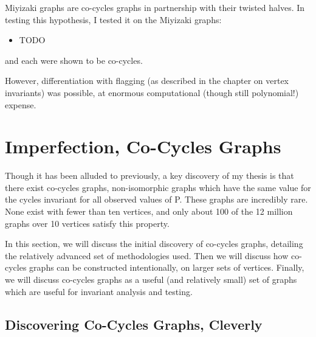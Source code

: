 Miyizaki graphs are co-cycles graphs in partnership with their twisted halves.
In testing this hypothesis, I tested it on the Miyizaki graphs:
\begin{itemize}
\item{TODO}
\end{itemize}
and each were shown to be co-cycles.

However, differentiation with flagging (as described in the chapter on vertex invariants) was possible, at enormous computational (though still polynomial!) expense.

\section{Imperfection, Co-Cycles Graphs}

Though it has been alluded to previously, a key discovery of my thesis is that there exist co-cycles graphs, non-isomorphic graphs which have the same value for the cycles invariant for all observed values of P.
These graphs are incredibly rare.
None exist with fewer than ten vertices, and only about 100 of the 12 million graphs over 10 vertices satisfy this property.

In this section, we will discuss the initial discovery of co-cycles graphs, detailing the relatively advanced set of methodologies used.
Then we will discuss how co-cycles graphs can be constructed intentionally, on larger sets of vertices.
Finally, we will discuss co-cycles graphs as a useful (and relatively small) set of graphs which are useful for invariant analysis and testing.

\subsection{Discovering Co-Cycles Graphs, Cleverly}

